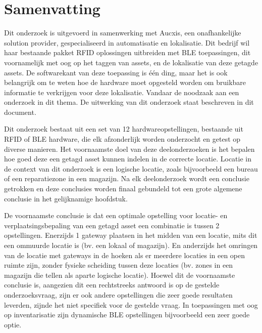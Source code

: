 
%


\chapter{Samenvatting}

Dit onderzoek is uitgevoerd in samenwerking met Aucxis, een onafhankelijke solution provider, gespecialiseerd in automatisatie en lokalisatie. Dit bedrijf wil haar bestaande pakket RFID oplossingen uitbreiden met BLE toepassingen, dit voornamelijk met oog op het taggen van assets, en de lokalisatie van deze getagde assets. De softwarekant van deze toepassing is één ding, maar het is ook belangrijk om te weten hoe de hardware moet opgesteld worden om bruikbare informatie te verkrijgen voor deze lokalisatie. Vandaar de noodzaak aan een onderzoek in dit thema. De uitwerking van dit onderzoek staat beschreven in dit document. 

Dit onderzoek bestaat uit een set van 12 hardwareopstellingen, bestaande uit RFID of BLE hardware, die elk afzonderlijk worden onderzocht en getest op diverse manieren. Het voornaamste doel van deze deelonderzoeken is het bepalen hoe goed deze een getagd asset kunnen indelen in de correcte locatie. Locatie in de context van dit onderzoek is een logische locatie, zoals bijvoorbeeld een bureau of een reparatiezone in een magazijn. Na elk deelonderzoek wordt een conclusie getrokken en deze conclusies worden finaal gebundeld tot een grote algemene conclusie in het gelijknamige hoofdstuk. 

De voornaamste conclusie is dat een optimale opstelling voor locatie- en verplaatsingsbepaling van een getagd asset een combinatie is tussen 2 opstellingen. Enerzijds 1 gateway plaatsen in het midden van een locatie, mits dit een ommuurde locatie is (bv. een lokaal of magazijn). En anderzijds het omringen van de locatie met gateways in de hoeken als er meerdere locaties in een open ruimte zijn, zonder fysieke scheiding tussen deze locaties (bv. zones in een magazijn die tellen als aparte logische locatie). 
Hoewel dit de voornaamste conclusie is, aangezien dit een rechtstreeks antwoord is op de gestelde onderzoeksvraag, zijn er ook andere opstellingen die zeer goede resultaten leverden, zijnde het niet specifiek voor de gestelde vraag. In toepassingen met oog op inventarisatie zijn dynamische BLE opstellingen bijvoorbeeld een zeer goede optie.

